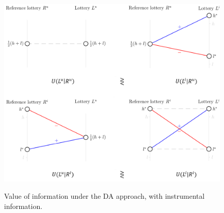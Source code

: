 \begin{figure}[ht]
  \caption{Value of information under the DA approach, with instrumental information.}\label{fig:instrumental-KR}
  \begin{center}
  {\includegraphics[width=1\textwidth]{./figures/theory_fig4.png}}
  \end{center}
\end{figure}

